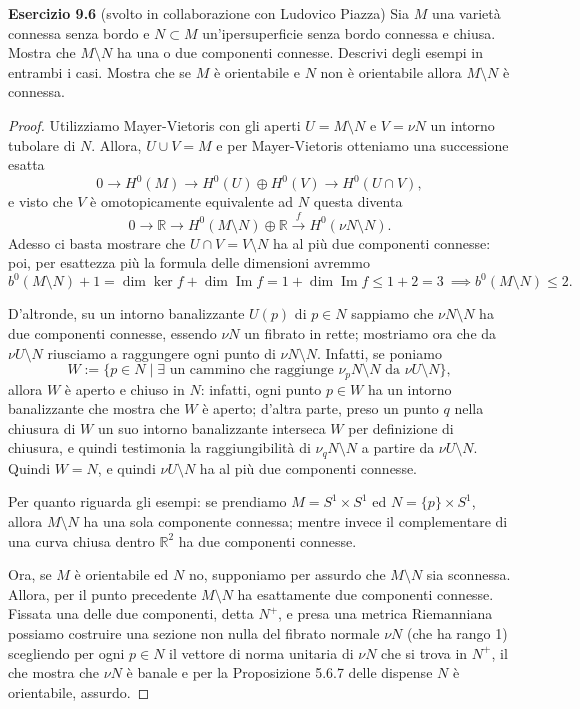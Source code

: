 \documentclass[a4paper]{article}
\newcommand{\R}{\mathbb{R}}
\renewcommand{\Im}{\operatorname{Im}}
\theoremstyle{definition}
\theoremstyle{definition}
\theoremstyle{remark}
\theoremstyle{definition}
\begin{document}
\textbf{Esercizio 9.6} (svolto in collaborazione con Ludovico Piazza)
Sia $M$ una varietà connessa senza bordo e $N \subset M$ un'ipersuperficie senza bordo connessa e chiusa. Mostra che $M \setminus N$ ha una o due componenti connesse. Descrivi degli esempi in entrambi i casi. Mostra che se $M$ è orientabile e $N$ non è orientabile allora $M \setminus N$ è connessa.

\begin{proof}
    Utilizziamo Mayer-Vietoris con gli aperti $U=M\setminus N$ e $V=\nu N$ un intorno tubolare di $N$. Allora, $U\cup V=M$ e per Mayer-Vietoris otteniamo una successione esatta
    \[
        0\to H^0(M)\to H^0(U)\oplus H^0(V)\to H^0(U\cap V),
    \]
    e visto che $V$ è omotopicamente equivalente ad $N$ questa diventa
    \[
        0\to \R\to H^0(M\setminus N)\oplus \R\overset{f}{\to} H^0(\nu N\setminus N).
    \]
    Adesso ci basta mostrare che $U\cap V=V\setminus N$ ha al più due componenti connesse: poi, per esattezza più la formula delle dimensioni avremmo
    \[
        b^0(M\setminus N)+1=\dim \ker f + \dim \Im f = 1 + \dim \Im f\leq 1+2=3 ~\implies b^0(M\setminus N)\leq 2.
    \]

    D'altronde, su un intorno banalizzante $U(p)$ di $p\in N$ sappiamo che $\nu N \setminus N$ ha due componenti connesse, essendo $\nu N$ un fibrato in rette; mostriamo ora che da
    $\nu U \setminus N$ riusciamo a raggungere ogni punto di $\nu N \setminus N$. Infatti, se poniamo
    \[
        W := \{p\in N \mid \exists \text{ un cammino che raggiunge } \nu_p{N}\setminus N \text{ da } \nu U\setminus N\},
    \]
    allora $W$ è aperto e chiuso in $N$: infatti, ogni punto $p\in W$ ha un intorno banalizzante che mostra che $W$ è aperto; d'altra parte, preso un punto $q$ nella chiusura di
    $W$ un suo intorno banalizzante interseca $W$ per definizione di chiusura, e quindi testimonia la raggiungibilità di $\nu_q N\setminus N$ a partire
    da $\nu U \setminus N$.
    Quindi $W=N$, e quindi $\nu U \setminus N$ ha al più due componenti connesse.

    Per quanto riguarda gli esempi: se prendiamo $M=S^1\times S^1$ ed $N=\{p\}\times S^1$, allora $M\setminus N$ ha una sola componente connessa; mentre invece il complementare di una curva chiusa dentro $\R^2$ ha due componenti connesse.

    Ora, se $M$ è orientabile ed $N$ no, supponiamo per assurdo che $M\setminus N$ sia sconnessa. Allora, per il punto precedente $M\setminus N$ ha esattamente due componenti connesse. Fissata una delle due componenti, detta $N^+$, e presa una metrica Riemanniana possiamo costruire una sezione non nulla del fibrato normale $\nu N$ (che ha rango 1) scegliendo per ogni $p\in N$ il vettore di norma unitaria di $\nu N$ che si trova in $N^+$, il che mostra che $\nu N$ è banale e per la Proposizione 5.6.7 delle dispense $N$ è orientabile, assurdo.
\end{proof}
\end{document}
